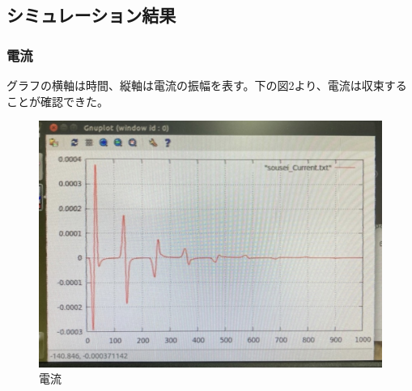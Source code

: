 \documentclass[dvipdfmx,autodetect-engine,titlepage]{jsarticle}
\begin{document}
\subsection{シミュレーション結果}

\subsubsection{電流}
グラフの横軸は時間、縦軸は電流の振幅を表す。下の図2より、電流は収束することが確認できた。\\
\begin{figure}[H]
  \centering
  \includegraphics[scale=0.25]{fg5.jpg}
  \caption{電流}\label{fig:図2}
\end{figure}
\end{document}

